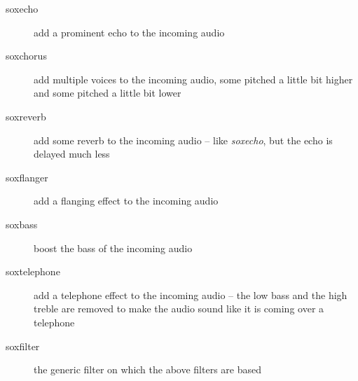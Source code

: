 \documentclass{article}
\begin{document}
\begin{description}
\item[soxecho]
add a prominent echo to the incoming audio
\item[soxchorus]
add multiple voices to the incoming audio, some pitched a little bit higher 
and some pitched a little bit lower
\item[soxreverb]
add some reverb to the incoming audio -- like {\it soxecho}, but the echo is delayed
much less
\item[soxflanger]
add a flanging effect to the incoming audio
\item[soxbass]
boost the bass of the incoming audio
\item[soxtelephone]
add a telephone effect to the incoming audio -- the low bass and the high treble
are removed to make the audio sound like it is coming over a telephone
\item[soxfilter]
the generic filter on which the above filters are based
\end{description}
\end{document}

